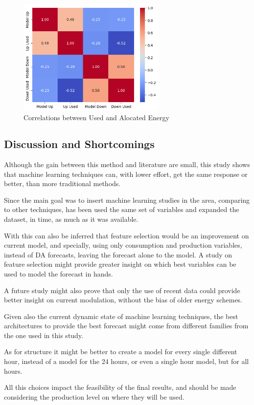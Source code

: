 \begin{figure}[H]
    \centering
    \includegraphics[width=0.65\textwidth]{plots/heatmap_correlation_pred.png}
    \caption{Correlations between Used and Alocated Energy}
    \label{fig:mode_pred_corres}
  \end{figure}

\par

\subsection{Discussion and Shortcomings}


\textcolor[rgb]{0.43, 0.21, 0.1}{Although the gain between this method and literature \cite{Algarvio2024} are small, this study shows that machine learning techniques can, with lower effort, get the same response or better, than more traditional methods.} \par
\textcolor[rgb]{0.43, 0.21, 0.1}{Since the main goal was to insert machine learning studies in the area, comparing to other techniques, has been used the same set of variables and expanded the dataset, in time, as much as it was available.} \par
\textcolor[rgb]{0.43, 0.21, 0.1}{With this can also be inferred that feature selection would be an improvement on current model, and specially, using only consumption and production variables, instead of DA forecasts, leaving the forecast alone to the model. A study on feature selection might provide greater insight on which best variables can be used to model the forecast in hands.} \par
\textcolor[rgb]{0.43, 0.21, 0.1}{A future study might also prove that only the use of recent data could provide better insight on current modulation, without the bias of older energy schemes.} \par
\textcolor[rgb]{0.43, 0.21, 0.1}{Given also the current dynamic state of machine learning techniques, the best architectures to provide the best forecast might come from different families from the one used in this study.} \par
\textcolor[rgb]{0.43, 0.21, 0.1}{As for structure it might be better to create a model for every single different hour, instead of a model for the 24 hours, or even a single hour model, but for all hours.} \par
\textcolor[rgb]{0.43, 0.21, 0.1}{All this choices impact the feasibility of the final results, and should be made considering the production level on where they will be used.} \par


